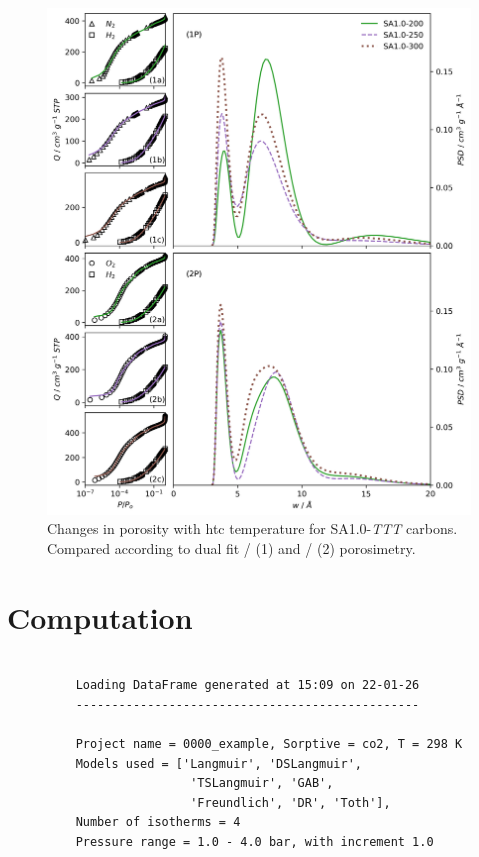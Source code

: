 \begin{appendices}
\begin{figure}[hptb]
    \centering
    \includegraphics[width=\columnwidth, keepaspectratio]{5-dual_isotherm/figs/SA100-xxx_isopsd.png}
    \caption{Changes in porosity with \gls{htc} temperature for SA1.0-\textit{TTT} carbons. Compared according to dual fit / (1) and / (2) porosimetry.}
    \label{fig:SA100-xxx_isoposd}
\end{figure}

\chapter{Computation}
\newpage

\begin{figure}[h]
\centering
    \begin{verbatim}
        
    Loading DataFrame generated at 15:09 on 22-01-26
    ------------------------------------------------
    
    Project name = 0000_example, Sorptive = co2, T = 298 K
    Models used = ['Langmuir', 'DSLangmuir', 
                    'TSLangmuir', 'GAB', 
                    'Freundlich', 'DR', 'Toth'], 
    Number of isotherms = 4
    Pressure range = 1.0 - 4.0 bar, with increment 1.0
                

\end{verbatim}
\end{figure}
\end{appendices}
